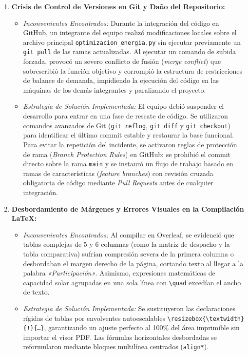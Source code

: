\documentclass[11pt,a4paper]{article}
\begin{document}
\begin{enumerate}
    \item \textbf{Crisis de Control de Versiones en Git y Daño del Repositorio:}
    \begin{itemize}
        \item \textit{Inconvenientes Encontrados:} Durante la integración del código en GitHub, un integrante del equipo realizó modificaciones locales sobre el archivo principal \texttt{optimizacion\_energia.py} sin ejecutar previamente un \texttt{git pull} de las ramas actualizadas. Al ejecutar un comando de subida forzada, provocó un severo conflicto de fusión (\textit{merge conflict}) que sobrescribió la función objetivo y corrompió la estructura de restricciones de balance de demanda, impidiendo la ejecución del código en las máquinas de los demás integrantes y paralizando el proyecto.
        \item \textit{Estrategia de Solución Implementada:} El equipo debió suspender el desarrollo para entrar en una fase de rescate de código. Se utilizaron comandos avanzados de Git (\texttt{git reflog}, \texttt{git diff} y \texttt{git checkout}) para identificar el último commit estable y restaurar la base funcional. Para evitar la repetición del incidente, se activaron reglas de protección de rama (\textit{Branch Protection Rules}) en GitHub: se prohibió el commit directo sobre la rama \texttt{main} y se instauró un flujo de trabajo basado en ramas de características (\textit{feature branches}) con revisión cruzada obligatoria de código mediante \textit{Pull Requests} antes de cualquier integración.
    \end{itemize}

    \item \textbf{Desbordamiento de Márgenes y Errores Visuales en la Compilación LaTeX:}
    \begin{itemize}
        \item \textit{Inconvenientes Encontrados:} Al compilar en Overleaf, se evidenció que tablas complejas de 5 y 6 columnas (como la matriz de despacho y la tabla comparativa) sufrían compresión severa de la primera columna o desbordaban el margen derecho de la página, cortando texto al llegar a la palabra \textit{«Participación»}. Asimismo, expresiones matemáticas de capacidad solar agrupadas en una sola línea con \texttt{\textbackslash quad} excedían el ancho de texto.
        \item \textit{Estrategia de Solución Implementada:} Se sustituyeron las declaraciones rígidas de tablas por envolventes autoescalables \texttt{\textbackslash resizebox\{\textbackslash textwidth\}\{!\}\{\dots\}}, garantizando un ajuste perfecto al 100\% del área imprimible sin importar el visor PDF. Las fórmulas horizontales desbordadas se reformularon mediante bloques multilínea centrados (\texttt{align*}).
    \end{itemize}


\end{enumerate}
\end{document}
